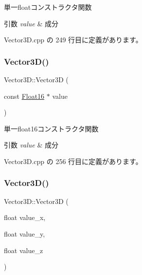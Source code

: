 単一floatコンストラクタ関数 


\begin{DoxyParams}{引数}
{\em value} & 成分 \\
\hline
\end{DoxyParams}


 Vector3\+D.\+cpp の 249 行目に定義があります。

\mbox{\label{class_vector3_d_a62a6c07e15fa66cb220fb3e511582683}} 
\subsubsection{\texorpdfstring{Vector3\+D()}{Vector3D()}\hspace{0.1cm}{\footnotesize\ttfamily [3/5]}}
{\footnotesize\ttfamily Vector3\+D\+::\+Vector3D (\begin{DoxyParamCaption}\item[{const \mbox{\hyperlink{_vector3_d_8h_afe61185afc2bf3856c12613d99eede01}{Float16}} $\ast$}]{value }\end{DoxyParamCaption})}



単一float16コンストラクタ関数 


\begin{DoxyParams}{引数}
{\em value} & 成分 \\
\hline
\end{DoxyParams}


 Vector3\+D.\+cpp の 256 行目に定義があります。

\mbox{\label{class_vector3_d_abe8fbafd6d5d8b44f1c79fe3f135cc71}} 
\subsubsection{\texorpdfstring{Vector3\+D()}{Vector3D()}\hspace{0.1cm}{\footnotesize\ttfamily [4/5]}}
{\footnotesize\ttfamily Vector3\+D\+::\+Vector3D (\begin{DoxyParamCaption}\item[{float}]{value\+\_\+x,  }\item[{float}]{value\+\_\+y,  }\item[{float}]{value\+\_\+z }\end{DoxyParamCaption})}



